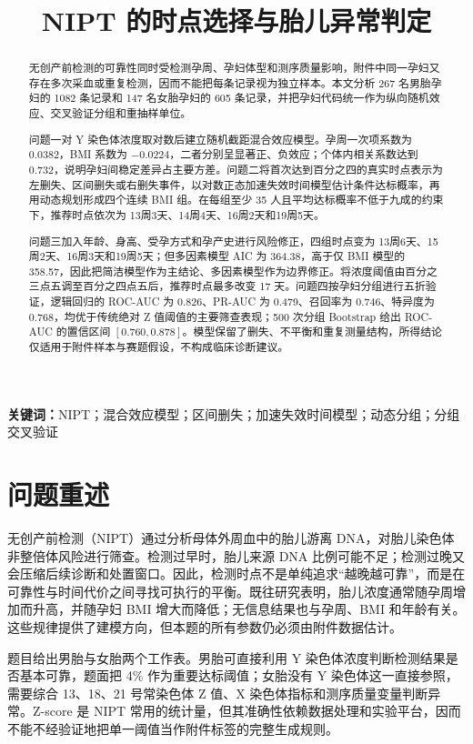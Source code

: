 \documentclass[UTF8,a4paper,12pt]{ctexart}
\title{NIPT 的时点选择与胎儿异常判定}
\author{}
\date{}
\begin{document}
\maketitle

\begin{abstract}
无创产前检测的可靠性同时受检测孕周、孕妇体型和测序质量影响，附件中同一孕妇又存在多次采血或重复检测，因而不能把每条记录视为独立样本。本文分析 267 名男胎孕妇的 1082 条记录和 147 名女胎孕妇的 605 条记录，并把孕妇代码统一作为纵向随机效应、交叉验证分组和重抽样单位。

问题一对 Y 染色体浓度取对数后建立随机截距混合效应模型。孕周一次项系数为 0.0382，BMI 系数为 $-0.0224$，二者分别呈显著正、负效应；个体内相关系数达到 0.732，说明孕妇间稳定差异占主要方差。问题二将首次达到百分之四的真实时点表示为左删失、区间删失或右删失事件，以对数正态加速失效时间模型估计条件达标概率，再用动态规划形成四个连续 BMI 组。在每组至少 35 人且平均达标概率不低于九成的约束下，推荐时点依次为 13周3天、14周4天、16周2天和19周5天。

问题三加入年龄、身高、受孕方式和孕产史进行风险修正，四组时点变为 13周6天、15周2天、16周3天和19周5天；但多因素模型 AIC 为 364.38，高于仅 BMI 模型的 358.57，因此把简洁模型作为主结论、多因素模型作为边界修正。将浓度阈值由百分之三点五调至百分之四点五后，推荐时点最多改变 17 天。问题四按孕妇分组进行五折验证，逻辑回归的 ROC-AUC 为 0.826、PR-AUC 为 0.479、召回率为 0.746、特异度为 0.768，均优于传统绝对 Z 值阈值的主要筛查表现；500 次分组 Bootstrap 给出 ROC-AUC 的置信区间 $[0.760,0.878]$。模型保留了删失、不平衡和重复测量结构，所得结论仅适用于附件样本与赛题假设，不构成临床诊断建议。
\end{abstract}

\noindent\textbf{关键词：}NIPT；混合效应模型；区间删失；加速失效时间模型；动态分组；分组交叉验证

\section{问题重述}

无创产前检测（NIPT）通过分析母体外周血中的胎儿游离 DNA，对胎儿染色体非整倍体风险进行筛查。检测过早时，胎儿来源 DNA 比例可能不足；检测过晚又会压缩后续诊断和处置窗口。因此，检测时点不是单纯追求“越晚越可靠”，而是在可靠性与时间代价之间寻找可执行的平衡。既往研究表明，胎儿浓度通常随孕周增加而升高，并随孕妇 BMI 增大而降低\cite{deng,rolnik}；无信息结果也与孕周、BMI 和年龄有关\cite{gazdarica}。这些规律提供了建模方向，但本题的所有参数仍必须由附件数据估计。

题目给出男胎与女胎两个工作表。男胎可直接利用 Y 染色体浓度判断检测结果是否基本可靠，题面把 4\% 作为重要达标阈值；女胎没有 Y 染色体这一直接参照，需要综合 13、18、21 号常染色体 Z 值、X 染色体指标和测序质量变量判断异常。Z-score 是 NIPT 常用的统计量，但其准确性依赖数据处理和实验平台\cite{zhang}，因而不能不经验证地把单一阈值当作附件标签的完整生成规则。
\end{document}
